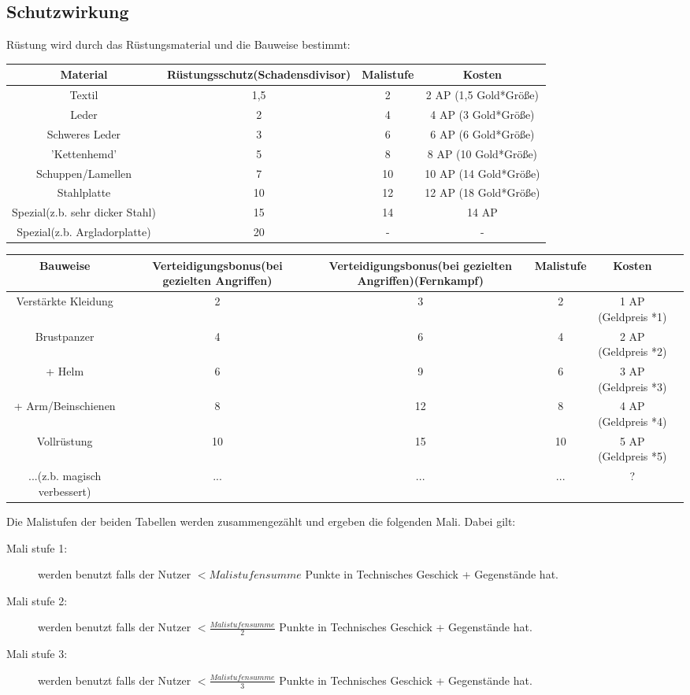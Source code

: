 \subsection{Schutzwirkung}
Rüstung wird durch das Rüstungsmaterial und die Bauweise bestimmt:
\begin{tabulary}{\textwidth}{|C|C|C|C|}
\hline 
Material & Rüstungsschutz(Schadensdivisor) & Malistufe & Kosten\\ 
\hline
Textil & 1,5 & 2 & 2 AP (1,5 Gold*Größe) \\
\hline 
Leder & 2 & 4 & 4 AP (3 Gold*Größe) \\
\hline 
Schweres Leder & 3 & 6 & 6 AP (6 Gold*Größe)\\
\hline 
'Kettenhemd' & 5 & 8 & 8 AP (10 Gold*Größe)\\
\hline 
Schuppen/Lamellen & 7 & 10 & 10 AP (14 Gold*Größe)\\
\hline 
Stahlplatte & 10 & 12 & 12 AP (18 Gold*Größe)\\
\hline 
Spezial(z.b. sehr dicker Stahl) & 15 & 14 & 14 AP\\
\hline 
Spezial(z.b. Argladorplatte) & 20 & - & -\\
\hline 
\end{tabulary}

\begin{tabulary}{\textwidth}{|C|C|C|C|C|C|}
\hline 
Bauweise & Verteidigungsbonus(bei gezielten Angriffen) & Verteidigungsbonus(bei gezielten Angriffen)(Fernkampf) & Malistufe & Kosten\\ 
\hline
Verstärkte Kleidung & 2 & 3 & 2 & 1 AP (Geldpreis *1)\\
\hline 
Brustpanzer & 4 & 6 & 4 & 2 AP (Geldpreis *2)\\
\hline 
+ Helm & 6 & 9 & 6 & 3 AP (Geldpreis *3)\\
\hline 
+ Arm/Beinschienen & 8 & 12 & 8 & 4 AP (Geldpreis *4)\\
\hline 
Vollrüstung & 10 & 15 & 10 & 5 AP (Geldpreis *5)\\
\hline 
...(z.b. magisch verbessert) & ... & ... & ... & ?\\
\hline 
\end{tabulary}

Die Malistufen der beiden Tabellen werden zusammengezählt und ergeben die folgenden Mali. Dabei gilt: 
\begin{description}
\item[Mali stufe 1:] werden benutzt falls der Nutzer $< Malistufensumme$ Punkte in Technisches Geschick + Gegenstände hat.
\item[Mali stufe 2:] werden benutzt falls der Nutzer $< \frac{Malistufensumme}{2}$ Punkte in Technisches Geschick + Gegenstände hat.
\item[Mali stufe 3:] werden benutzt falls der Nutzer $< \frac{Malistufensumme}{3}$ Punkte in Technisches Geschick + Gegenstände hat.
\end{description}

